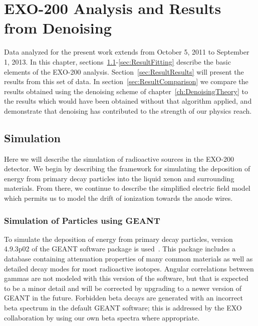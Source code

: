 \renewcommand{\thechapter}{7}
\chapter{EXO-200 Analysis and Results from Denoising}
\label{ch:DenoisingResults}

Data analyzed for the present work extends from October 5, 2011 to September 1, 2013.  In this chapter, sections~\ref{sec:ResultSimulation}-\ref{sec:ResultFitting} describe the basic elements of the EXO-200 analysis.  Section~\ref{sec:ResultResults} will present the results from this set of data.  In section~\ref{sec:ResultComparison} we compare the results obtained using the denoising scheme of chapter~\ref{ch:DenoisingTheory} to the results which would have been obtained without that algorithm applied, and demonstrate that denoising has contributed to the strength of our physics reach.

\section{Simulation}\label{sec:ResultSimulation}

Here we will describe the simulation of radioactive sources in the EXO-200 detector.  We begin by describing the framework for simulating the deposition of energy from primary decay particles into the liquid xenon and surrounding materials.  From there, we continue to describe the simplified electric field model which permits us to model the drift of ionization towards the anode wires.

\subsection{Simulation of Particles using GEANT}

To simulate the deposition of energy from primary decay particles, version 4.9.3p02 of the GEANT software package is used~\cite{Agostinelli2003250,1610988}.  This package includes a database containing attenuation properties of many common materials as well as detailed decay modes for most radioactive isotopes.  Angular correlations between gammas are not modeled with this version of the software, but that is expected to be a minor detail and will be corrected by upgrading to a newer version of GEANT in the future.  Forbidden beta decays are generated with an incorrect beta spectrum in the default GEANT software; this is addressed by the EXO collaboration by using our own beta spectra where appropriate.

